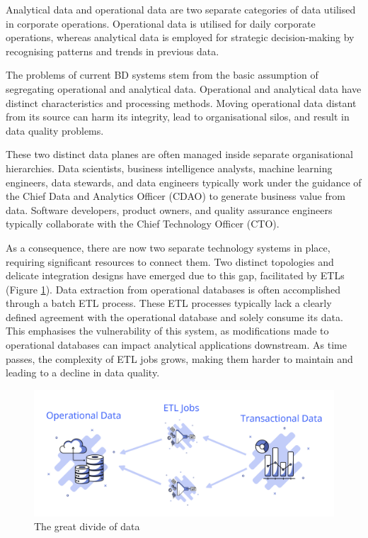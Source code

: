 \documentclass[journal]{IEEEtran}
\begin{document}
Analytical data and operational data are two separate categories of data utilised in corporate operations. Operational data is utilised for daily corporate operations, whereas analytical data is employed for strategic decision-making by recognising patterns and trends in previous data.

The problems of current BD systems stem from the basic assumption of segregating operational and analytical data. Operational and analytical data have distinct characteristics and processing methods. Moving operational data distant from its source can harm its integrity, lead to organisational silos, and result in data quality problems. 

These two distinct data planes are often managed inside separate organisational hierarchies. Data scientists, business intelligence analysts, machine learning engineers, data stewards, and data engineers typically work under the guidance of the Chief Data and Analytics Officer (CDAO) to generate business value from data. Software developers, product owners, and quality assurance engineers typically collaborate with the Chief Technology Officer (CTO).

As a consequence, there are now two separate technology systems in place, requiring significant resources to connect them. Two distinct topologies and delicate integration designs have emerged due to this gap, facilitated by ETLs (Figure \ref{fig:dataPlanes}). Data extraction from operational databases is often accomplished through a batch ETL process. These ETL processes typically lack a clearly defined agreement with the operational database and solely consume its data. This emphasises the vulnerability of this system, as modifications made to operational databases can impact analytical applications downstream. As time passes, the complexity of ETL jobs grows, making them harder to maintain and leading to a decline in data quality. 

\begin{figure}[h]
  \centering
  \includegraphics[width=\linewidth]{images/data-planes.png}
  \caption{The great divide of data}
  \label{fig:dataPlanes}
\end{figure}
\end{document}
